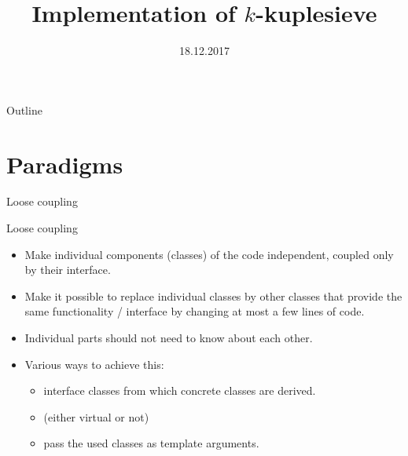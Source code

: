 \documentclass{beamer}
\title[Sieving code]{Implementation of $k$-kuplesieve}
\date{18.12.2017}
\institute{ENS Lyon}
\begin{document}
\frame{\maketitle}

\begin{frame}{Outline}
\tableofcontents
\end{frame}
\section{Paradigms}

\begin{frame}{Loose coupling}
\begin{block}{Loose coupling}
\begin{itemize}
\item Make individual components (classes) of the code independent, coupled only by their interface.
\item Make it possible to replace individual classes by other classes that provide the same functionality / interface by changing at most a few lines of code.
\item Individual parts should not need to know about each other.
\item Various ways to achieve this:
\begin{itemize}
\item<2-> interface classes from which concrete classes are derived.
\item<2-> (either virtual or not)
\item<2-> \alert<3->{pass the used classes as template arguments.}
\end{itemize}
\end{itemize}
\end{block}
\end{frame}
\end{document}
